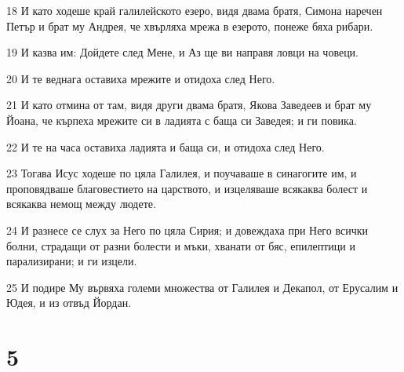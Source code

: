 \par 18 И като ходеше край галилейското езеро, видя двама братя, Симона наречен Петър и брат му Андрея, че хвърляха мрежа в езерото, понеже бяха рибари.
\par 19 И казва им: Дойдете след Мене, и Аз ще ви направя ловци на човеци.
\par 20 И те веднага оставиха мрежите и отидоха след Него.
\par 21 И като отмина от там, видя други двама братя, Якова Заведеев и брат му Йоана, че кърпеха мрежите си в ладията с баща си Заведея; и ги повика.
\par 22 И те на часа оставиха ладията и баща си, и отидоха след Него.
\par 23 Тогава Исус ходеше по цяла Галилея, и поучаваше в синагогите им, и проповядваше благовестието на царството, и изцеляваше всякаква болест и всякаква немощ между людете.
\par 24 И разнесе се слух за Него по цяла Сирия; и довеждаха при Него всички болни, страдащи от разни болести и мъки, хванати от бяс, епилептици и парализирани; и ги изцели.
\par 25 И подире Му вървяха големи множества от Галилея и Декапол, от Ерусалим и Юдея, и из отвъд Йордан.

\chapter{5}

